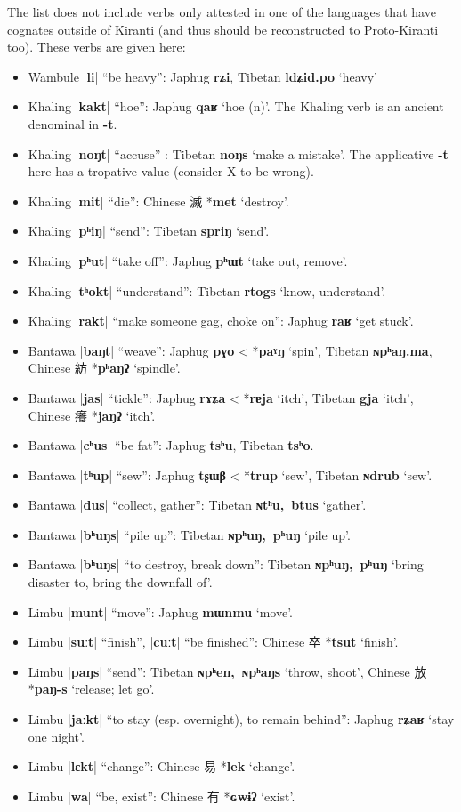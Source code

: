 \documentclass[oldfontcommands,oneside,a4paper,11pt]{article}
\newcommand{\ipa}[1]{\textbf{{\phon\mbox{#1}}}} %
\newcommand{\zh}[1]{{\cn #1}}
\newcommand{\dhatu}[2]{|\ipa{#1}| ``#2''}
\begin{document}
The list does not include verbs only attested in one of the languages that have cognates outside of Kiranti (and thus should be reconstructed to Proto-Kiranti too). These verbs are given here:

\begin{itemize}
\item Wambule \dhatu{li}{be heavy}: Japhug \ipa{rʑi}, Tibetan \ipa{ldʑid.po} `heavy'
\item Khaling \dhatu{kakt}{hoe}: Japhug \ipa{qaʁ} `hoe (n)'. The Khaling verb is an ancient denominal in \ipa{-t}.
\item Khaling \dhatu{noŋt}{accuse} : Tibetan \ipa{noŋs} `make a mistake'. The applicative \ipa{-t} here has a tropative value (consider X to be wrong).
\item Khaling \dhatu{mit}{die}: Chinese \zh{滅} *\ipa{met} `destroy'.
\item Khaling \dhatu{pʰiŋ}{send}: Tibetan \ipa{spriŋ} `send'.
\item Khaling \dhatu{pʰut}{take off}: Japhug \ipa{pʰɯt} `take out, remove'.
\item Khaling \dhatu{tʰokt}{understand}: Tibetan \ipa{rtogs} `know, understand'.
\item Khaling \dhatu{rakt}{make someone gag, choke on}: Japhug \ipa{raʁ} `get stuck'.
\item Bantawa \dhatu{baŋt}{weave}: Japhug \ipa{pɣo} < *\ipa{paˠŋ} `spin', Tibetan \ipa{ɴpʰaŋ.ma}, Chinese \zh{紡} *\ipa{pʰaŋʔ} `spindle'.
\item Bantawa \dhatu{jas}{tickle}: Japhug \ipa{rɤʑa} < *\ipa{rɐja} `itch', Tibetan \ipa{gja} `itch', Chinese \zh{癢} *\ipa{jaŋʔ} `itch'.
\item Bantawa \dhatu{cʰus}{be fat}: Japhug \ipa{tsʰu}, Tibetan \ipa{tsʰo}.
\item Bantawa \dhatu{tʰup}{sew}: Japhug \ipa{tʂɯβ} < *\ipa{trup} `sew', Tibetan \ipa{ɴdrub} `sew'.
\item Bantawa \dhatu{dus}{collect, gather}: Tibetan \ipa{ɴtʰu, btus} `gather'.
\item Bantawa \dhatu{bʰuŋs}{pile up}: Tibetan \ipa{ɴpʰuŋ, pʰuŋ} `pile up'.
\item Bantawa \dhatu{bʰuŋs}{to destroy, break down}: Tibetan \ipa{ɴpʰuŋ, pʰuŋ} `bring disaster to, bring the downfall of'.
\item Limbu \dhatu{munt}{move}: Japhug \ipa{mɯnmu} `move'.
\item Limbu \dhatu{suːt}{finish}, \dhatu{cuːt}{be finished}: Chinese \zh{卒} *\ipa{tsut} `finish'.
\item Limbu \dhatu{paŋs}{send}: Tibetan \ipa{ɴpʰen, ɴpʰaŋs} `throw, shoot', Chinese \zh{放} *\ipa{paŋ-s} `release; let go'.
\item Limbu \dhatu{jaːkt}{to stay (esp. overnight), to remain behind}: Japhug \ipa{rʑaʁ} `stay one night'.
\item Limbu \dhatu{lɛkt}{change}: Chinese \zh{易} *\ipa{lek} `change'.
\item Limbu \dhatu{wa}{be, exist}: Chinese \zh{有} *\ipa{ɢwɨʔ} `exist'.
\end{itemize}
 


\end{document}
